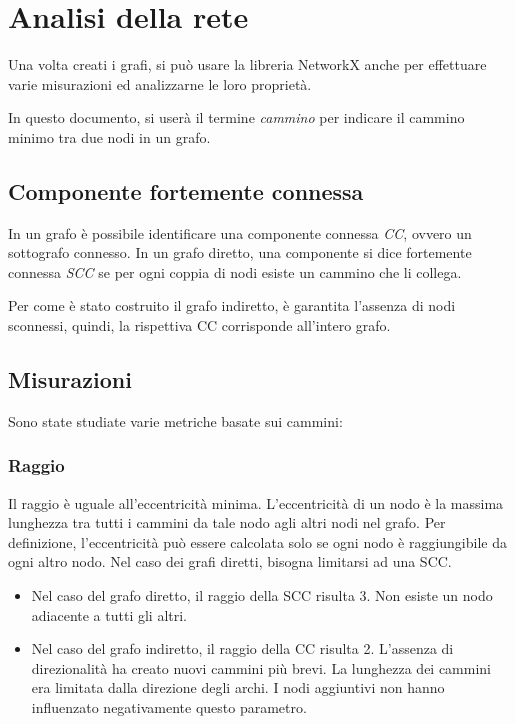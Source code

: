 \documentclass[a4paper, 11pt, twoside]{article}
\begin{document}
\section{Analisi della rete}
Una volta creati i grafi, si può usare la libreria NetworkX anche per effettuare varie misurazioni ed analizzarne le loro proprietà.

In questo documento, si userà il termine \textit{cammino} per indicare il cammino minimo tra due nodi in un grafo.

\subsection{Componente fortemente connessa}
In un grafo è possibile identificare una componente connessa \textit{CC}, ovvero un sottografo connesso. In un grafo diretto, una componente si dice fortemente connessa \textit{SCC} se per ogni coppia di nodi esiste un cammino che li collega.

Per come è stato costruito il grafo indiretto, è garantita l'assenza di nodi sconnessi, quindi, la rispettiva CC corrisponde all'intero grafo.

\subsection{Misurazioni}
Sono state studiate varie metriche basate sui cammini:

\subsubsection{Raggio}
Il raggio è uguale all'eccentricità minima. L'eccentricità di un nodo è la massima lunghezza tra tutti i cammini da tale nodo agli altri nodi nel grafo. Per definizione, l'eccentricità può essere calcolata solo se ogni nodo è raggiungibile da ogni altro nodo. Nel caso dei grafi diretti, bisogna limitarsi ad una SCC.
\begin{itemize}
    \item Nel caso del grafo diretto, il raggio della SCC risulta 3. Non esiste un nodo adiacente a tutti gli altri.
    \item Nel caso del grafo indiretto, il raggio della CC risulta 2. L'assenza di direzionalità ha creato nuovi cammini più brevi. La lunghezza dei cammini era limitata dalla direzione degli archi. I nodi aggiuntivi non hanno influenzato negativamente questo parametro.
\end{itemize}
\end{document}
